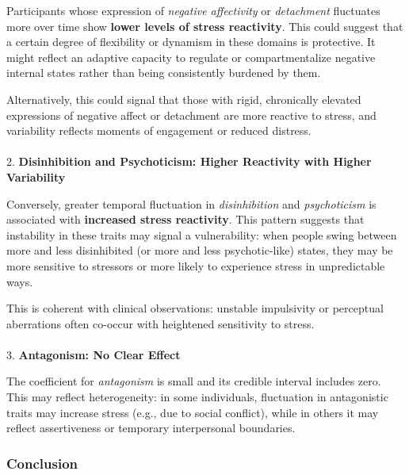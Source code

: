 \documentclass[
  11pt,
  a4paper,
  onecolumn]{article}
\makeatletter
\let\oldparagraph\paragraph
\renewcommand{\paragraph}{
    \@ifstar
      \xxxParagraphStar
      \xxxParagraphNoStar
  }
\newcommand{\xxxParagraphStar}[1]{\oldparagraph*{#1}\mbox{}}
\newcommand{\xxxParagraphNoStar}[1]{\oldparagraph{#1}\mbox{}}
\makeatother
\begin{document}
Participants whose expression of \emph{negative affectivity} or
\emph{detachment} fluctuates more over time show \textbf{lower levels of
stress reactivity}. This could suggest that a certain degree of
flexibility or dynamism in these domains is protective. It might reflect
an adaptive capacity to regulate or compartmentalize negative internal
states rather than being consistently burdened by them.

Alternatively, this could signal that those with rigid, chronically
elevated expressions of negative affect or detachment are more reactive
to stress, and variability reflects moments of engagement or reduced
distress.

\paragraph{\texorpdfstring{2. \textbf{Disinhibition and Psychoticism:
Higher Reactivity with Higher
Variability}}{2. Disinhibition and Psychoticism: Higher Reactivity with Higher Variability}}\label{disinhibition-and-psychoticism-higher-reactivity-with-higher-variability}

Conversely, greater temporal fluctuation in \emph{disinhibition} and
\emph{psychoticism} is associated with \textbf{increased stress
reactivity}. This pattern suggests that instability in these traits may
signal a vulnerability: when people swing between more and less
disinhibited (or more and less psychotic-like) states, they may be more
sensitive to stressors or more likely to experience stress in
unpredictable ways.

This is coherent with clinical observations: unstable impulsivity or
perceptual aberrations often co-occur with heightened sensitivity to
stress.

\paragraph{\texorpdfstring{3. \textbf{Antagonism: No Clear
Effect}}{3. Antagonism: No Clear Effect}}\label{antagonism-no-clear-effect}

The coefficient for \emph{antagonism} is small and its credible interval
includes zero. This may reflect heterogeneity: in some individuals,
fluctuation in antagonistic traits may increase stress (e.g., due to
social conflict), while in others it may reflect assertiveness or
temporary interpersonal boundaries.

\subsubsection{Conclusion}\label{conclusion}
\end{document}
